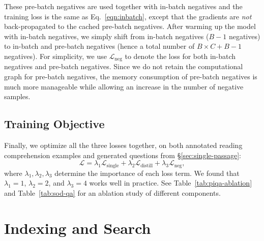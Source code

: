 \documentclass[11pt,a4paper]{article}
\newcommand\ti[1]{\textit{#1}}
\begin{document}
These pre-batch negatives are used together with in-batch negatives and the training loss is the same as Eq.~\eqref{eqn:inbatch}, except that the gradients are \ti{not} back-propagated to the cached pre-batch negatives.
After warming up the model with in-batch negatives, we simply shift from in-batch negatives ($B - 1$ negatives) to in-batch and pre-batch negatives (hence a total number of $B \times C + B - 1$ negatives).
For simplicity, we use $\mathcal{L}_\text{neg}$ to denote the loss for both in-batch negatives and pre-batch negatives. Since we do not retain the computational graph for pre-batch negatives, the memory consumption of pre-batch negatives is much more manageable while allowing an increase in the number of negative samples.


\subsection{Training Objective} Finally, we optimize all the three losses together, on both annotated reading comprehension examples and generated questions from \S\ref{sec:single-passage}:
\begin{equation}\label{eqn:aggregate}
    \mathcal{L} = \lambda_1 \mathcal{L}_\text{single} + \lambda_2 \mathcal{L}_\text{distill} + \lambda_3 \mathcal{L}_\text{neg},
\end{equation}
\noindent where $\lambda_1,\lambda_2,\lambda_3$ determine the importance of each loss term.
We found that $\lambda_1=1$, $\lambda_2=2$, and $\lambda_3=4$ works well in practice. See  Table~\ref{tab:piqa-ablation} and Table~\ref{tab:sod-qa} for an ablation study of different components.






\section{Indexing and Search}
\label{sec:indexing_and_search}
\end{document}
